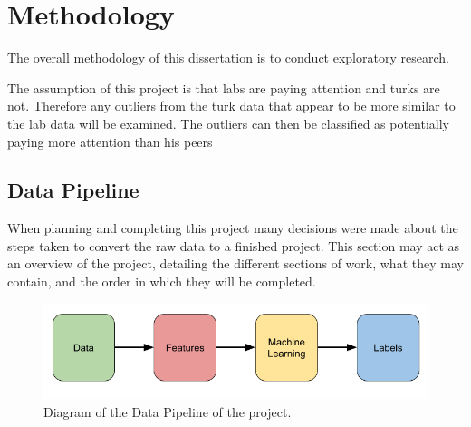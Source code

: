 \documentclass{article}
\begin{document}


\section{Methodology}

The overall methodology of this dissertation is to conduct exploratory research.

The assumption of this project is that labs are paying attention and turks are not.
Therefore any outliers from the turk data that appear to be more similar to the lab data will be examined.
The outliers can then be classified as potentially paying more attention than his peers





\subsection{Data Pipeline}

When planning and completing this project many decisions were made about the steps taken to convert the raw data to a finished project.
This section may act as an overview of the project, detailing the different sections of work, what they may contain, and the order in which they will be completed.

\begin{figure}[ht]
    \centering
    \includegraphics[scale=0.5]{Images/Data-Pipeline.png}
    \caption{Diagram of the Data Pipeline of the project.}
    \label{fig:test}
\end{figure}
\end{document}
